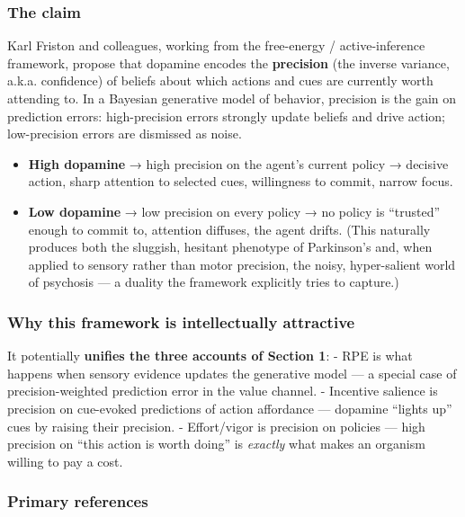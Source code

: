 \subsubsection{The claim}\label{01_dopamine_substrate-the-claim-1}

Karl Friston and colleagues, working from the free-energy / active-inference framework, propose that dopamine encodes the \textbf{precision} (the inverse variance, a.k.a. confidence) of beliefs about which actions and cues are currently worth attending to. In a Bayesian generative model of behavior, precision is the gain on prediction errors: high-precision errors strongly update beliefs and drive action; low-precision errors are dismissed as noise.

\begin{itemize}
\tightlist
\item
  \textbf{High dopamine} → high precision on the agent's current policy → decisive action, sharp attention to selected cues, willingness to commit, narrow focus.
\item
  \textbf{Low dopamine} → low precision on every policy → no policy is ``trusted'' enough to commit to, attention diffuses, the agent drifts. (This naturally produces both the sluggish, hesitant phenotype of Parkinson's and, when applied to sensory rather than motor precision, the noisy, hyper-salient world of psychosis --- a duality the framework explicitly tries to capture.)
\end{itemize}

\subsubsection{Why this framework is intellectually attractive}\label{01_dopamine_substrate-why-this-framework-is-intellectually-attractive}

It potentially \textbf{unifies the three accounts of Section 1}: - RPE is what happens when sensory evidence updates the generative model --- a special case of precision-weighted prediction error in the value channel. - Incentive salience is precision on cue-evoked predictions of action affordance --- dopamine ``lights up'' cues by raising their precision. - Effort/vigor is precision on policies --- high precision on ``this action is worth doing'' is \emph{exactly} what makes an organism willing to pay a cost.

\subsubsection{Primary references}\label{01_dopamine_substrate-primary-references}


